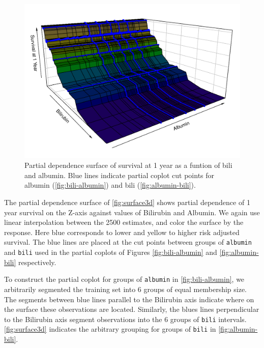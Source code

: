 \documentclass[article, nojss]{jss}
\begin{document}
\begin{Schunk}
\begin{figure}[!htb]

{\centering \includegraphics{rfs-surface3d-1}

}

\caption{Partial dependence surface of survival at 1 year as a funtion of bili and albumin. Blue lines indicate partial coplot cut points for albumin (\autoref{fig:bili-albumin}) and bili (\autoref{fig:albumin-bili}).}\label{fig:surface3d}
\end{figure}
\end{Schunk}

The partial dependence surface of \autoref{fig:surface3d} shows partial
dependence of 1 year survival on the Z-axis against values of Bilirubin
and Albumin. We again use linear interpolation between the 2500
estimates, and color the surface by the response. Here blue corresponds
to lower and yellow to higher risk adjusted survival. The blue lines are
placed at the cut points between groups of \texttt{albumin} and
\texttt{bili} used in the partial coplots of Figures
\ref{fig:bili-albumin} and \ref{fig:albumin-bili} respectively.

To construct the partial coplot for groups of \texttt{albumin} in
\autoref{fig:bili-albumin}, we arbitrarily segmented the training set
into 6 groups of equal membership size. The segments between blue lines
parallel to the Bilirubin axis indicate where on the surface these
observations are located. Similarly, the blues lines perpendicular to
the Bilirubin axis segment observations into the 6 groups of
\texttt{bili} intervals. \autoref{fig:surface3d} indicates the arbitrary
grouping for groups of \texttt{bili} in \autoref{fig:albumin-bili}.
\end{document}
